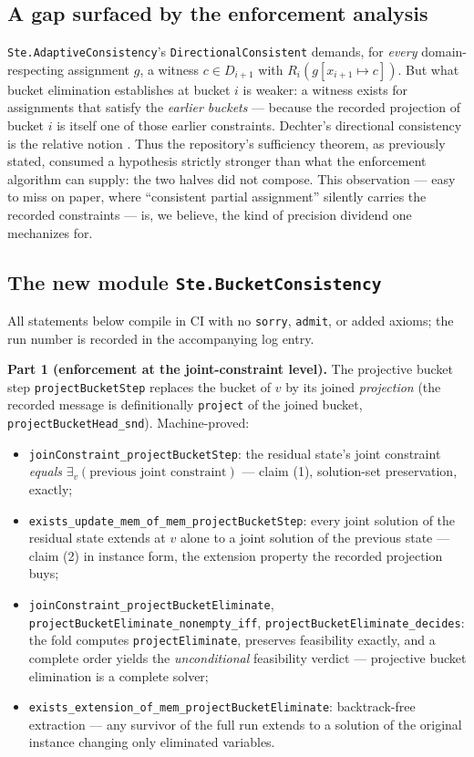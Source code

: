 \documentclass[11pt]{article}
\newcommand{\ste}[1]{\texttt{#1}}
\begin{document}
\subsection{A gap surfaced by the enforcement analysis}
\label{sec:gap}

\ste{Ste.AdaptiveConsistency}'s \ste{DirectionalConsistent} demands,
for \emph{every} domain-respecting assignment $g$, a witness $c \in
D_{i+1}$ with $R_i(g[x_{i+1} \mapsto c])$. But what bucket elimination
establishes at bucket $i$ is weaker: a witness exists for assignments
that satisfy the \emph{earlier buckets} --- because the recorded
projection of bucket $i$ is itself one of those earlier constraints.
Dechter's directional consistency is the relative notion
\citep[ch.~4]{dechter2003constraint}. Thus the repository's
sufficiency theorem, as previously stated, consumed a hypothesis
strictly stronger than what the enforcement algorithm can supply: the
two halves did not compose. This observation --- easy to miss on paper,
where ``consistent partial assignment'' silently carries the recorded
constraints --- is, we believe, the kind of precision dividend one
mechanizes for.

\subsection{The new module \ste{Ste.BucketConsistency}}

All statements below compile in CI with no \ste{sorry}, \ste{admit},
or added axioms; the run number is recorded in the accompanying log
entry.

\textbf{Part 1 (enforcement at the joint-constraint level).} The
projective bucket step \ste{projectBucketStep} replaces the bucket of
$v$ by its joined \emph{projection} (the recorded message is
definitionally \ste{project} of the joined bucket,
\ste{projectBucketHead\_snd}). Machine-proved:
\begin{itemize}
\item \ste{joinConstraint\_projectBucketStep}: the residual state's
  joint constraint \emph{equals} $\exists_v(\text{previous joint
  constraint})$ --- claim (1), solution-set preservation, exactly;
\item \ste{exists\_update\_mem\_of\_mem\_projectBucketStep}: every
  joint solution of the residual state extends at $v$ alone to a joint
  solution of the previous state --- claim (2) in instance form, the
  extension property the recorded projection buys;
\item \ste{joinConstraint\_projectBucketEliminate},
  \ste{projectBucketEliminate\_nonempty\_iff},
  \ste{projectBucketEliminate\_decides}: the fold computes
  \ste{projectEliminate}, preserves feasibility exactly, and a
  complete order yields the \emph{unconditional} feasibility verdict
  --- projective bucket elimination is a complete solver;
\item \ste{exists\_extension\_of\_mem\_projectBucketEliminate}:
  backtrack-free extraction --- any survivor of the full run extends
  to a solution of the original instance changing only eliminated
  variables.
\end{itemize}
\end{document}
